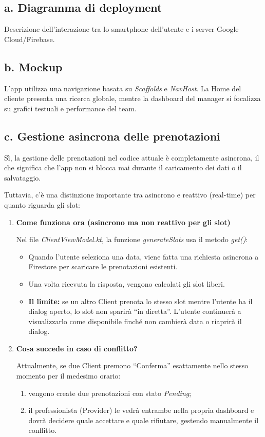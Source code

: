 \documentclass[12pt]{article}
\begin{document}
\subsection{a. Diagramma di deployment}
Descrizione dell'interazione tra lo smartphone dell'utente e i server Google Cloud/Firebase.

\subsection{b. Mockup}
L'app utilizza una navigazione basata su \textit{Scaffolds} e \textit{NavHost}. La Home del cliente presenta una ricerca globale, mentre la dashboard del manager si focalizza su grafici testuali e performance del team.

\subsection{c. Gestione asincrona delle prenotazioni}
Sì, la gestione delle prenotazioni nel codice attuale è completamente asincrona, il che significa che l'app non si blocca mai durante il caricamento dei dati o il salvataggio.

Tuttavia, c'è una distinzione importante tra asincrono e reattivo (real-time) per quanto riguarda gli slot:

\begin{enumerate}
    \item \textbf{Come funziona ora (asincrono ma non reattivo per gli slot)}

    Nel file \textit{ClientViewModel.kt}, la funzione \textit{generateSlots} usa il metodo \textit{get()}:
    \begin{itemize}
        \item Quando l'utente seleziona una data, viene fatta una richiesta asincrona a Firestore per scaricare le prenotazioni esistenti.
        \item Una volta ricevuta la risposta, vengono calcolati gli slot liberi.
        \item \textbf{Il limite:} se un altro Client prenota lo stesso slot mentre l'utente ha il dialog aperto, lo slot non sparirà ``in diretta''. L'utente continuerà a visualizzarlo come disponibile finché non cambierà data o riaprirà il dialog.
    \end{itemize}

    \item \textbf{Cosa succede in caso di conflitto?}

    Attualmente, se due Client premono ``Conferma'' esattamente nello stesso momento per il medesimo orario:
    \begin{enumerate}
        \item vengono create due prenotazioni con stato \textit{Pending};
        \item il professionista (Provider) le vedrà entrambe nella propria dashboard e dovrà decidere quale accettare e quale rifiutare, gestendo manualmente il conflitto.
    \end{enumerate}
\end{enumerate}
\end{document}
